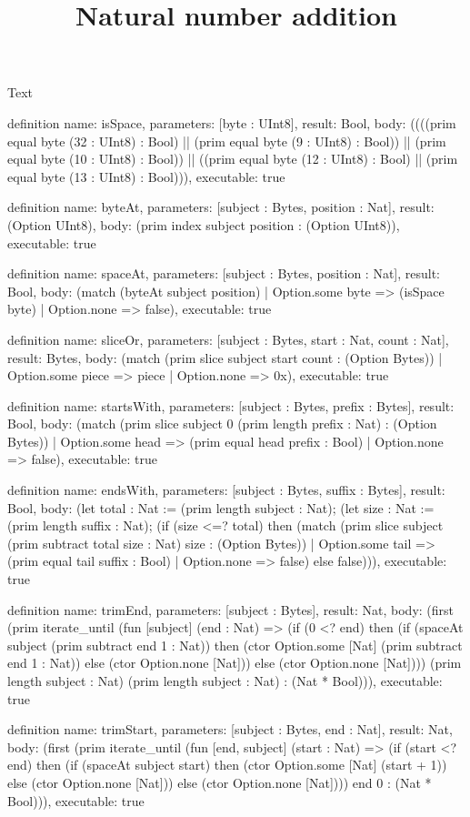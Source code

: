 \begin{lexlean}{Text}
\title{Natural number addition}
\begin{semanticmodule}
definition{
  name: isSpace,
  parameters: [byte : UInt8],
  result: Bool,
  body: ((((prim equal byte (32 : UInt8) : Bool) || (prim equal byte (9 : UInt8) : Bool)) || (prim equal byte (10 : UInt8) : Bool)) || ((prim equal byte (12 : UInt8) : Bool) || (prim equal byte (13 : UInt8) : Bool))),
  executable: true
}

definition{
  name: byteAt,
  parameters: [subject : Bytes, position : Nat],
  result: (Option UInt8),
  body: (prim index subject position : (Option UInt8)),
  executable: true
}

definition{
  name: spaceAt,
  parameters: [subject : Bytes, position : Nat],
  result: Bool,
  body: (match (byteAt subject position)
    | Option.some byte => (isSpace byte)
    | Option.none => false),
  executable: true
}

definition{
  name: sliceOr,
  parameters: [subject : Bytes, start : Nat, count : Nat],
  result: Bytes,
  body: (match (prim slice subject start count : (Option Bytes))
    | Option.some piece => piece
    | Option.none => 0x),
  executable: true
}

definition{
  name: startsWith,
  parameters: [subject : Bytes, prefix : Bytes],
  result: Bool,
  body: (match (prim slice subject 0 (prim length prefix : Nat) : (Option Bytes))
    | Option.some head => (prim equal head prefix : Bool)
    | Option.none => false),
  executable: true
}

definition{
  name: endsWith,
  parameters: [subject : Bytes, suffix : Bytes],
  result: Bool,
  body: (let total : Nat := (prim length subject : Nat); (let size : Nat := (prim length suffix : Nat); (if (size <=? total) then (match (prim slice subject (prim subtract total size : Nat) size : (Option Bytes))
    | Option.some tail => (prim equal tail suffix : Bool)
    | Option.none => false) else false))),
  executable: true
}

definition{
  name: trimEnd,
  parameters: [subject : Bytes],
  result: Nat,
  body: (first (prim iterate_until (fun [subject] (end : Nat) => (if (0 <? end) then (if (spaceAt subject (prim subtract end 1 : Nat)) then (ctor Option.some [Nat] (prim subtract end 1 : Nat)) else (ctor Option.none [Nat])) else (ctor Option.none [Nat]))) (prim length subject : Nat) (prim length subject : Nat) : (Nat * Bool))),
  executable: true
}

definition{
  name: trimStart,
  parameters: [subject : Bytes, end : Nat],
  result: Nat,
  body: (first (prim iterate_until (fun [end, subject] (start : Nat) => (if (start <? end) then (if (spaceAt subject start) then (ctor Option.some [Nat] (start + 1)) else (ctor Option.none [Nat])) else (ctor Option.none [Nat]))) end 0 : (Nat * Bool))),
  executable: true
}


\end{semanticmodule}
\end{lexlean}
